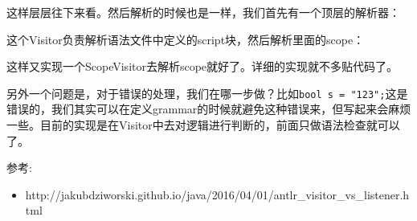 \documentclass[12pt]{article}
\begin{document}
这样层层往下来看。然后解析的时候也是一样，我们首先有一个顶层的解析器：

\begin{Shaded}
\begin{Highlighting}[]
 \OperatorTok{\textless{}}\OperatorTok{\textless{}}\OperatorTok{,}\OperatorTok{\textgreater{}\textgreater{}} \OperatorTok{\{}
       \OperatorTok{=}\OperatorTok{(}\OperatorTok{);}

     \OperatorTok{\textless{}}\OperatorTok{,}\OperatorTok{\textgreater{}} \OperatorTok{(}\OperatorTok{)} \OperatorTok{\{}
    \OperatorTok{\}}
\end{Highlighting}
\end{Shaded}

这个Visitor负责解析语法文件中定义的script块，然后解析里面的scope：

\begin{Shaded}
\begin{Highlighting}[]
\OperatorTok{=}  \OperatorTok{(}\OperatorTok{);}
\OperatorTok{(}\OperatorTok{{-}\textgreater{}} \OperatorTok{\{}
\OperatorTok{(}\OperatorTok{,}\OperatorTok{());}
\OperatorTok{=}\OperatorTok{(}\OperatorTok{);}
\OperatorTok{(}\OperatorTok{,}\OperatorTok{);}
        \OperatorTok{\});}
\end{Highlighting}
\end{Shaded}

这样又实现一个ScopeVisitor去解析scope就好了。详细的实现就不多贴代码了。

另外一个问题是，对于错误的处理，我们在哪一步做？比如\texttt{bool\ s\ =\ "123";}这是错误的，我们其实可以在定义grammar的时候就避免这种错误来，但写起来会麻烦一些。目前的实现是在Visitor中去对逻辑进行判断的，前面只做语法检查就可以了。

参考:

\begin{itemize}
\tightlist
\item
  http://jakubdziworski.github.io/java/2016/04/01/antlr\_visitor\_vs\_listener.html
\end{itemize}
\end{document}
